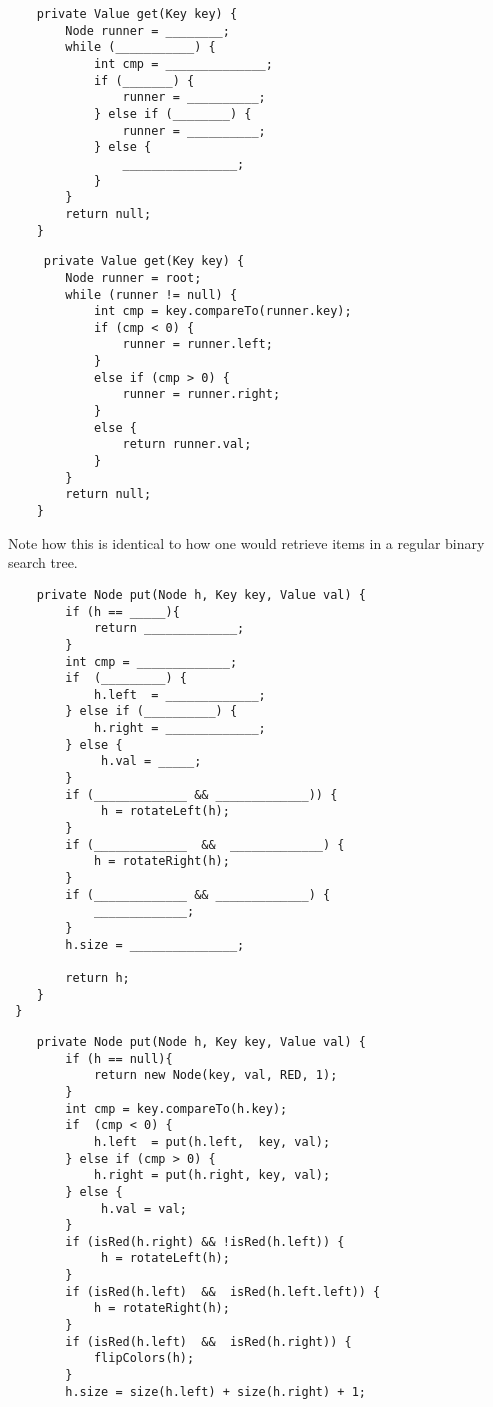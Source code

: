 \begin{enumerate}
   
\begin{lstlisting}
    private Value get(Key key) {
        Node runner = ________;
        while (___________) {
            int cmp = ______________;
            if (_______) {
                runner = __________;
            } else if (________) {
                runner = __________;
            } else {
                ________________;
            }
        }
        return null;
    }
\end{lstlisting}
\begin{solution}
\begin{lstlisting}
     private Value get(Key key) {
        Node runner = root;
        while (runner != null) {
            int cmp = key.compareTo(runner.key);
            if (cmp < 0) {
                runner = runner.left;
            } 
            else if (cmp > 0) {
                runner = runner.right;
            }
            else {
                return runner.val;
            }          
        }
        return null;
    }
\end{lstlisting}
Note how this is identical to how one would retrieve items in a regular binary search tree.
\end{solution}
\begin{lstlisting}
    private Node put(Node h, Key key, Value val) { 
        if (h == _____){
            return _____________;
        }
        int cmp = _____________;
        if  (_________) {
            h.left  = _____________; 
        } else if (__________) {
            h.right = _____________; 
        } else {
             h.val = _____;
        }          
        if (_____________ && _____________)) {
             h = rotateLeft(h);
        }    
        if (_____________  &&  _____________) {
            h = rotateRight(h);
        }
        if (_____________ && _____________) {
            _____________;
        }    
        h.size = _______________;
        
        return h;
    }
 }
\end{lstlisting}
\begin{solution}
\begin{lstlisting}
    private Node put(Node h, Key key, Value val) { 
        if (h == null){
            return new Node(key, val, RED, 1);
        }
        int cmp = key.compareTo(h.key);
        if  (cmp < 0) {
            h.left  = put(h.left,  key, val); 
        } else if (cmp > 0) {
            h.right = put(h.right, key, val); 
        } else {
             h.val = val;
        }          
        if (isRed(h.right) && !isRed(h.left)) {
             h = rotateLeft(h);
        }    
        if (isRed(h.left)  &&  isRed(h.left.left)) {
            h = rotateRight(h);
        }
        if (isRed(h.left)  &&  isRed(h.right)) {
            flipColors(h);
        }    
        h.size = size(h.left) + size(h.right) + 1;
        

\end{lstlisting}
\end{solution}
\end{enumerate}
